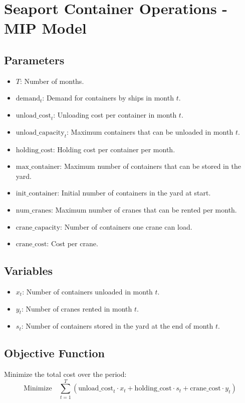 \documentclass{article}
\begin{document}
\section*{Seaport Container Operations - MIP Model}

\subsection*{Parameters}
\begin{itemize}
    \item $T$: Number of months.
    \item $\text{demand}_t$: Demand for containers by ships in month $t$.
    \item $\text{unload\_cost}_t$: Unloading cost per container in month $t$.
    \item $\text{unload\_capacity}_t$: Maximum containers that can be unloaded in month $t$.
    \item $\text{holding\_cost}$: Holding cost per container per month.
    \item $\text{max\_container}$: Maximum number of containers that can be stored in the yard.
    \item $\text{init\_container}$: Initial number of containers in the yard at start.
    \item $\text{num\_cranes}$: Maximum number of cranes that can be rented per month.
    \item $\text{crane\_capacity}$: Number of containers one crane can load.
    \item $\text{crane\_cost}$: Cost per crane.
\end{itemize}

\subsection*{Variables}
\begin{itemize}
    \item $x_t$: Number of containers unloaded in month $t$.
    \item $y_t$: Number of cranes rented in month $t$.
    \item $s_t$: Number of containers stored in the yard at the end of month $t$.
\end{itemize}

\subsection*{Objective Function}
Minimize the total cost over the period:
\[
\text{Minimize} \quad \sum_{t=1}^{T} \left( \text{unload\_cost}_t \cdot x_t + \text{holding\_cost} \cdot s_t + \text{crane\_cost} \cdot y_t \right)
\]
\end{document}
